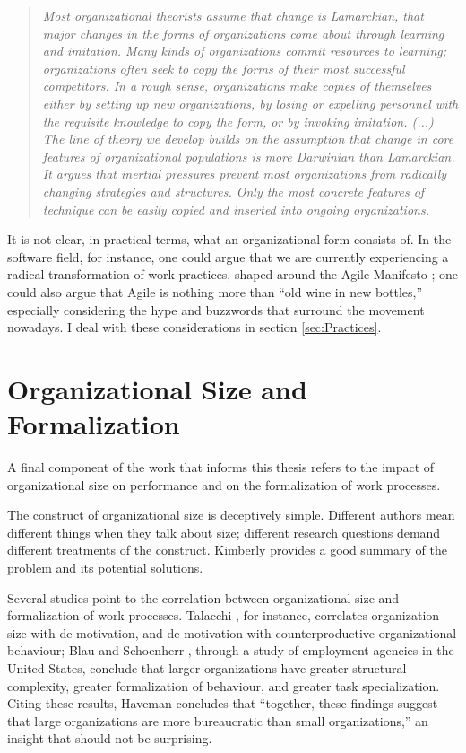 \begin{quote}
\emph{Most organizational theorists assume that change is Lamarckian, that major changes in the forms of organizations come about through learning and imitation. Many kinds of organizations commit resources to learning; organizations often seek to copy the forms of their most successful competitors. In a rough sense, organizations make copies of themselves either by setting up new organizations, by losing or expelling personnel with the requisite knowledge to copy the form, or by invoking imitation. (...) The line of theory we develop builds on the assumption that change in core features of organizational populations is more Darwinian than Lamarckian. It argues that inertial pressures prevent most organizations from radically changing strategies and structures. Only the most concrete features of technique can be easily copied and inserted into ongoing organizations.}
\end{quote}

It is not clear, in practical terms, what an organizational form consists of. In the software field, for instance, one could argue that we are currently experiencing a radical transformation of work practices, shaped around the Agile Manifesto \cite{Beck2001}; one could also argue that Agile is nothing more than ``old wine in new bottles,'' especially considering the hype and buzzwords that surround the movement nowadays. I deal with these considerations in section \ref{sec:Practices}.


\section{Organizational Size and Formalization}
\label{sec:Size}

A final component of the work that informs this thesis refers to the impact of organizational size on performance and on the formalization of work processes.

The construct of organizational size is deceptively simple. Different authors mean different things when they talk about size; different research questions demand different treatments of the construct. Kimberly  provides a good summary of the problem and its potential solutions.

Several studies point to the correlation between organizational size and formalization of work processes. Talacchi , for instance, correlates organization size with de-motivation, and de-motivation with counterproductive organizational behaviour; Blau and Schoenherr , through a study of employment agencies in the United States, conclude that larger organizations have greater structural complexity, greater formalization of behaviour, and greater task specialization. Citing these results, Haveman  concludes that ``together, these findings suggest that large organizations are more bureaucratic than small organizations,'' an insight that should not be surprising.

